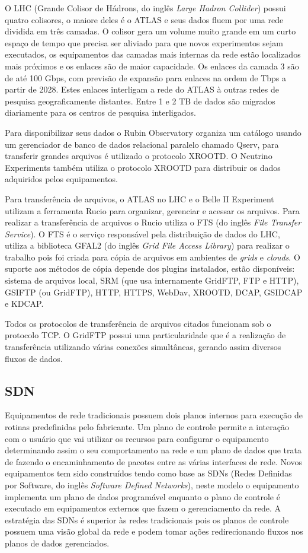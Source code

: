 \documentclass[12pt]{article}
\begin{document}
O LHC (Grande Colisor de Hádrons, do inglês \textit{Large Hadron Collider}) possui quatro colisores, o maiore deles é o ATLAS e seus dados fluem por uma rede dividida em três camadas. O colisor gera um volume muito grande em um curto espaço de tempo que precisa ser aliviado para que novos experimentos sejam executados, os equipamentos das camadas mais internas da rede estão localizados mais próximos e os enlaces são de maior capacidade. Os enlaces da camada 3 são de até 100 Gbps, com previsão de expansão para enlaces na ordem de Tbps a partir de 2028. Estes enlaces interligam a rede do ATLAS à outras redes de pesquisa geograficamente distantes. Entre 1 e 2 TB de dados são migrados diariamente para os centros de pesquisa interligados.

Para disponibilizar seus dados o Rubin Observatory organiza um catálogo usando um gerenciador de banco de dados relacional paralelo chamado Qserv, para transferir grandes arquivos é utilizado o protocolo XROOTD. O Neutrino Experiments também utiliza o protocolo XROOTD para distribuir os dados adquiridos pelos equipamentos.

Para transferência de arquivos, o ATLAS no LHC e o Belle II Experiment utilizam a ferramenta Rucio para organizar, gerenciar e acessar os arquivos. Para realizar a transferência de arquivos o Rucio utiliza o FTS (do inglês \textit{File Transfer Service}). O FTS é o serviço responsável pela distribuição de dados do LHC, utiliza a biblioteca GFAL2 (do inglês \textit{Grid File Access Library}) para realizar o trabalho pois foi criada para cópia de arquivos em ambientes de \textit{grids} e \textit{clouds}. O suporte aos métodos de cópia depende dos plugins instalados, estão disponíveis: sistema de arquivos local, SRM (que usa internamente GridFTP, FTP e HTTP), GSIFTP (ou GridFTP), HTTP, HTTPS, WebDav, XROOTD, DCAP, GSIDCAP e KDCAP.

Todos os protocolos de transferência de arquivos citados funcionam sob o protocolo TCP. O GridFTP possui uma particularidade que é a realização de transferência utilizando várias conexões simultâneas, gerando assim diversos fluxos de dados.

\subsection{SDN}

Equipamentos de rede tradicionais possuem dois planos internos para execução de rotinas predefinidas pelo fabricante. Um plano de controle permite a interação com o usuário que vai utilizar os recursos para configurar o equipamento determinando assim o seu comportamento na rede e um plano de dados que trata de fazendo o encaminhamento de pacotes entre as várias interfaces de rede. Novos equipamentos tem sido construídos tendo como base as SDNs (Redes Definidas por Software, do inglês \textit{Software Defined Networks}), neste modelo o equipamento implementa um plano de dados programável enquanto o plano de controle é executado em equipamentos externos que fazem o gerenciamento da rede. A estratégia das SDNs é superior às redes tradicionais pois os planos de controle possuem uma visão global da rede e podem tomar ações redirecionando fluxos nos planos de dados gerenciados.
\end{document}
